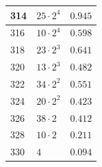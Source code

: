 \documentclass[a4paper, titlepage, 10pt]{article}
\begin{document}
\begin{minipage}{0.4\textwidth}
\begin{center}
\begin{tabular}{|l|l|l|}
  \hline
  314 & \( 25 \cdot 2^4 \) & \( 0.945 \) \\
  \hline
  316 & \( 10 \cdot 2^4 \) & \( 0.598 \) \\
  \hline
  318 & \( 23 \cdot 2^3 \) & \( 0.641 \) \\
  \hline
  320 & \( 13 \cdot 2^3 \) & \( 0.482 \) \\
  \hline
  322 & \( 34 \cdot 2^2 \) & \( 0.551 \) \\
  \hline
  324 & \( 20 \cdot 2^2 \) & \( 0.423 \) \\
  \hline
  326 & \( 38 \cdot 2 \) & \( 0.412 \) \\
  \hline
  328 & \( 10 \cdot 2 \) & \( 0.211 \) \\
  \hline
  330 & \( 4 \) & \( 0.094 \) \\
  \hline
 \end{tabular}
 
\end{center}
\end{minipage}
\hfill
\end{document}

